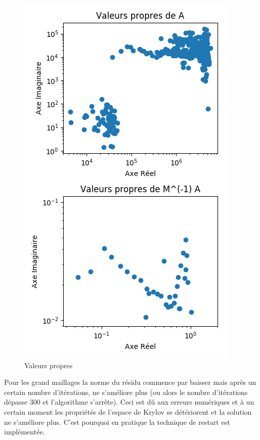 \documentclass[11pt]{article}
\begin{document}
\begin{figure}
\vspace{-8pt}
    \includegraphics[width=\linewidth]{valpropr.png}
    \caption{Valeurs propres}
    \label{valsing}
\end{figure}

Pour les grand maillages la norme du résidu commence par baisser mais après un certain nombre d'itérations, ne s'améliore plus (ou alors le nombre d'itérations dépasse 300 et l'algorithme s'arrête). Ceci est dû aux erreurs numériques et à un certain moment les propriétés de l'espace de Krylov se détériorent et la solution ne s'améliore plus. C'est pourquoi en pratique la technique de restart est implémentée. \\
\vspace{-8pt}
\end{document}

